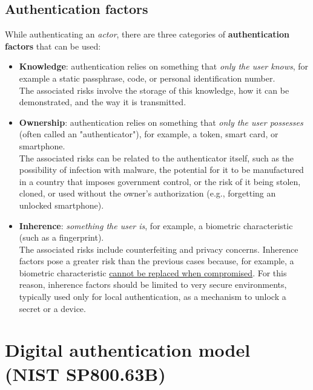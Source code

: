 \subsection{Authentication factors}
While authenticating an \emph{actor}, there are three categories of \textbf{authentication factors} that can be used:
\begin{itemize}
  \item \textbf{Knowledge}: authentication relies on something that \emph{only the user knows}, for example a static
        passphrase, code, or personal identification number.\\
        The associated risks involve the storage of this
        knowledge, how it can be demonstrated, and the way it is transmitted.
  \item \textbf{Ownership}: authentication relies on something that \emph{only the user possesses} (often called an
        "authenticator"), for example, a token, smart card, or smartphone.\\
        The associated risks can be related
        to the authenticator itself, such as the possibility of infection with malware, the potential for it to be
        manufactured in a country that imposes government control, or the risk of it being stolen, cloned, or
        used without the owner's authorization (e.g., forgetting an unlocked smartphone).
  \item \textbf{Inherence}: \emph{something the user is}, for example, a biometric characteristic (such as a fingerprint).\\
        The associated risks include counterfeiting and privacy concerns. Inherence factors pose a greater risk
        than the previous cases because, for example, a biometric characteristic \ul{cannot be
          replaced when compromised}. For this reason, inherence factors should be limited to very secure environments,
        typically used only for local authentication, as a mechanism to unlock a secret or a device.
\end{itemize}


\section{Digital authentication model (NIST SP800.63B)}\label{chap:digital-auth-model}


